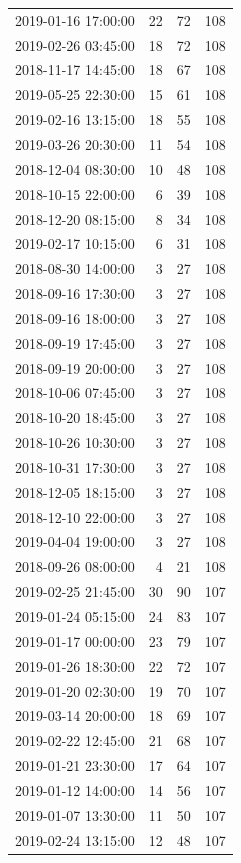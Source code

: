 \begin{tabular}{lrrr}
2019-01-16 17:00:00 & 22 & 72 & 108 \\
2019-02-26 03:45:00 & 18 & 72 & 108 \\
2018-11-17 14:45:00 & 18 & 67 & 108 \\
2019-05-25 22:30:00 & 15 & 61 & 108 \\
2019-02-16 13:15:00 & 18 & 55 & 108 \\
2019-03-26 20:30:00 & 11 & 54 & 108 \\
2018-12-04 08:30:00 & 10 & 48 & 108 \\
2018-10-15 22:00:00 & 6 & 39 & 108 \\
2018-12-20 08:15:00 & 8 & 34 & 108 \\
2019-02-17 10:15:00 & 6 & 31 & 108 \\
2018-08-30 14:00:00 & 3 & 27 & 108 \\
2018-09-16 17:30:00 & 3 & 27 & 108 \\
2018-09-16 18:00:00 & 3 & 27 & 108 \\
2018-09-19 17:45:00 & 3 & 27 & 108 \\
2018-09-19 20:00:00 & 3 & 27 & 108 \\
2018-10-06 07:45:00 & 3 & 27 & 108 \\
2018-10-20 18:45:00 & 3 & 27 & 108 \\
2018-10-26 10:30:00 & 3 & 27 & 108 \\
2018-10-31 17:30:00 & 3 & 27 & 108 \\
2018-12-05 18:15:00 & 3 & 27 & 108 \\
2018-12-10 22:00:00 & 3 & 27 & 108 \\
2019-04-04 19:00:00 & 3 & 27 & 108 \\
2018-09-26 08:00:00 & 4 & 21 & 108 \\
2019-02-25 21:45:00 & 30 & 90 & 107 \\
2019-01-24 05:15:00 & 24 & 83 & 107 \\
2019-01-17 00:00:00 & 23 & 79 & 107 \\
2019-01-26 18:30:00 & 22 & 72 & 107 \\
2019-01-20 02:30:00 & 19 & 70 & 107 \\
2019-03-14 20:00:00 & 18 & 69 & 107 \\
2019-02-22 12:45:00 & 21 & 68 & 107 \\
2019-01-21 23:30:00 & 17 & 64 & 107 \\
2019-01-12 14:00:00 & 14 & 56 & 107 \\
2019-01-07 13:30:00 & 11 & 50 & 107 \\
2019-02-24 13:15:00 & 12 & 48 & 107 \\

\end{tabular}
